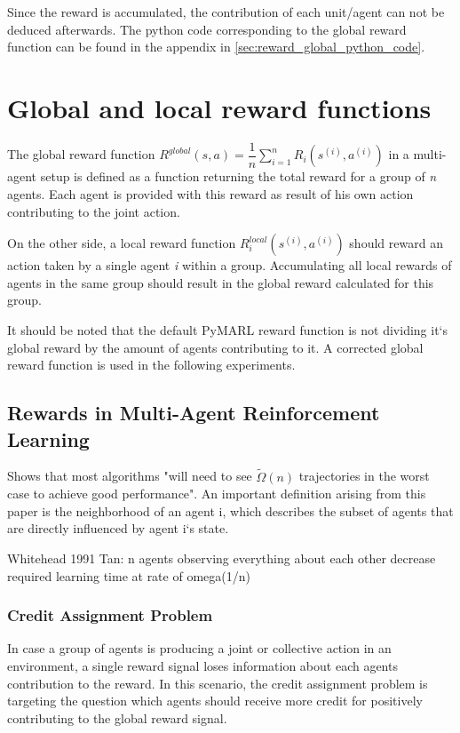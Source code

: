 Since the reward is accumulated, the contribution of each unit/agent can not be deduced afterwards. The python code corresponding to the global reward function can be found in the appendix in \autoref{sec:reward_global_python_code}.

\section{Global and local reward functions}\label{sec:global_local_r_function}
The global reward function $R^{global}(s, a)=\dfrac{1}{n} \sum_{i=1}^{n} R_i\left(s^{(i)}, a^{(i)}\right)$ in a multi-agent setup is defined as a function returning the total reward for a group of \textit{n} agents. Each agent is provided with this reward as result of his own action contributing to the joint action.

On the other side, a local reward function $R_{i}^{local}\left(s^{(i)}, a^{(i)}\right)$ should reward an action taken by a single agent \textit{i} within a group. Accumulating all local rewards of agents in the same group should result in the global reward calculated for this group. \cite{NIPS2005_2951}

It should be noted that the default PyMARL reward function is not dividing it`s global reward by the amount of agents contributing to it. A corrected global reward function is used in the following experiments.

\subsection{Rewards in Multi-Agent Reinforcement Learning}
\cite{NIPS2005_2951} Shows that most algorithms "will need to see $\tilde{\Omega}(n)$ trajectories in the worst case to achieve good performance". An important definition arising from this paper is the neighborhood of an agent i, which describes the subset of agents that are directly influenced by agent i`s state.

Whitehead 1991 Tan: n agents observing everything about each other decrease required learning time at rate of omega(1/n)


\subsubsection{Credit Assignment Problem}
In case a group of agents is producing a joint or collective action in an environment, a single reward signal loses information about each agents contribution to the reward. In this scenario, the credit assignment problem is targeting the question which agents should receive more credit for positively contributing to the global reward signal. \cite{sutton2018reinforcement}

